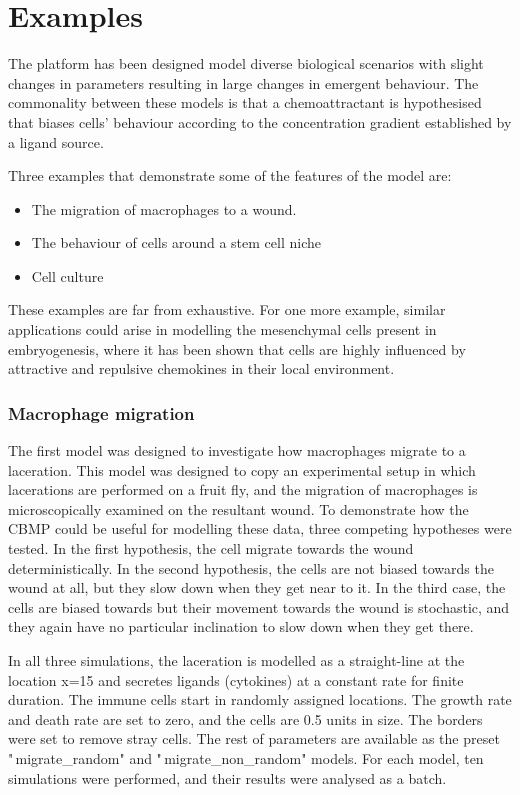 \documentclass[11.5pt]{article}
\begin{document}
\section{Examples}
The platform has been designed model diverse biological scenarios with 
slight changes in parameters resulting in large changes in emergent 
behaviour. The commonality between these models is that a 
chemoattractant is hypothesised that biases cells' behaviour according 
to the concentration gradient established by a ligand source.



Three examples that demonstrate some of the features of the model are:

\begin{itemize}
\item The migration of macrophages to a wound.
\item The behaviour of cells around a stem cell niche
\item Cell culture
\end{itemize}


These examples are far from exhaustive. For one more example, similar 
applications could arise in modelling the mesenchymal cells present in 
embryogenesis, where it has been shown that cells are highly influenced 
by attractive and repulsive chemokines in their local environment.

\subsubsection{Macrophage migration}
The first model was designed to investigate how macrophages migrate to a 
laceration. This model was designed to copy an experimental setup in 
which lacerations are performed on a fruit fly, and the migration of 
macrophages is microscopically examined on the resultant wound. To 
demonstrate how the CBMP could be useful for modelling these data, three 
competing hypotheses were tested. In the first hypothesis, the cell 
migrate towards the wound deterministically. In the second hypothesis, 
the cells are not biased towards the wound at all, but they slow down 
when they get near to it. In the third case, the cells are biased 
towards but their movement towards the wound is stochastic, and they 
again have no particular inclination to slow down when they get there.



In all three simulations, the laceration is modelled as a straight-line 
at the location x=15 and secretes ligands (cytokines) at a constant rate 
for finite duration. The immune cells start in randomly assigned 
locations. The growth rate and death rate are set to zero, and the cells 
are 0.5 units in size. The borders were set to remove stray cells. The 
rest of parameters are available as the preset "\,migrate\_random" and 
"\,migrate\_non\_random" models. For each model, ten simulations were 
performed, and their results were analysed as a batch.
\end{document}
